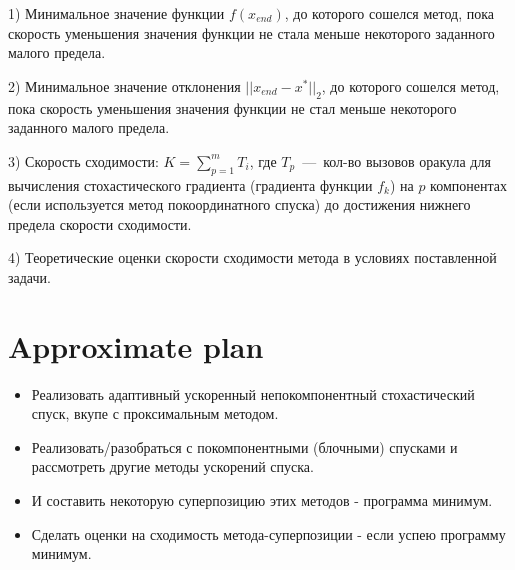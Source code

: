 \documentclass[]{scrartcl}
\begin{document}
1) Минимальное значение функции $f(x_{end})$, до которого сошелся метод, пока скорость уменьшения значения функции не стала меньше некоторого заданного малого предела.

2) Минимальное значение отклонения $||x_{end}-x^*||_2$, до которого сошелся метод, пока скорость уменьшения значения функции не стал меньше некоторого заданного малого предела.

3) Скорость сходимости: $K=\sum\limits_{p=1}^{m} T_i$, где $T_p$~---~кол-во вызовов оракула для вычисления стохастического градиента (градиента функции $f_k$) на $p$ компонентах (если используется метод покоординатного спуска) до достижения нижнего предела скорости сходимости.
 
4) Теоретические оценки скорости сходимости метода в условиях поставленной задачи.


\section{Approximate plan}
\begin{itemize}
	\item Реализовать адаптивный ускоренный непокомпонентный стохастический спуск, вкупе с проксимальным методом.
	\item Реализовать/разобраться с покомпонентными (блочными) спусками и рассмотреть другие методы ускорений спуска.
	\item И составить некоторую суперпозицию этих методов - программа минимум.
	\item Сделать оценки на сходимость метода-суперпозиции  - если успею программу минимум.
	
\end{itemize}



\end{document}
